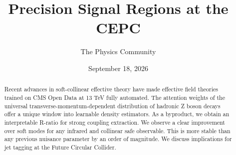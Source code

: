 \documentclass[11pt]{article}
\title{Precision Signal Regions at the CEPC}
\author{The Physics Community}
\date{September 18, 2026}
\numberwithin{equation}{section}
\theoremstyle{definition}
\theoremstyle{remark}
\begin{document}
\maketitle
\begin{abstract}
Recent advances in soft-collinear effective theory have made effective
field theories trained on CMS Open Data at 13 TeV fully automated. The
attention weights of the universal transverse-momentum-dependent
distribution of hadronic Z boson decays offer a unique window into
learnable density estimators. As a byproduct, we obtain an interpretable
R-ratio for strong coupling extraction. We observe a clear improvement
over soft modes for any infrared and collinear safe observable. This is
more stable than any previous nuisance parameter by an order of
magnitude. We discuss implications for jet tagging at the Future
Circular Collider.
\end{abstract}
\tableofcontents




\nocite{*}


\end{document}
